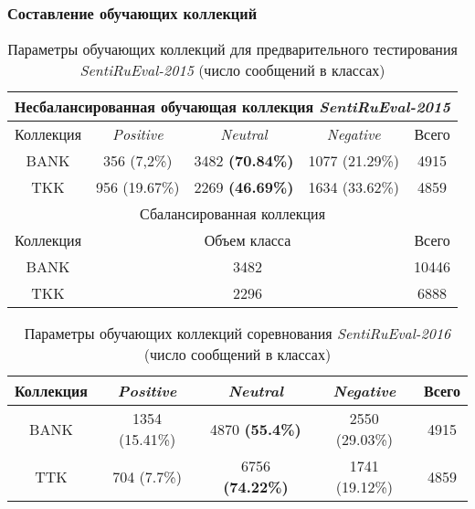 \subsubsection{Составление обучающих коллекций}

\begin{table}[!ht]
\centering
\caption{Параметры обучающих коллекций для предварительного тестирования {\it SentiRuEval-2015} (число сообщений в классах)}
\label{my-label}
\begin{tabular}{|c|c|c|c|c|}
\hline
\multicolumn{5}{|c|}{Несбалансированная обучающая коллекция {\it SentiRuEval-2015}}                 \\ \hline
Коллекция & \textit{Positive} & \textit{Neutral} & \textit{Negative} & Всего \\ \hline
BANK      & 356 (7,2\%)       & 3482 {\bf (70.84\%)}   & 1077 (21.29\%)    & 4915  \\ \hline
TKK       & 956 (19.67\%)     & 2269 {\bf (46.69\%)}   & 1634 (33.62\%)    & 4859  \\ \hline
\multicolumn{5}{|c|}{Сбалансированная коллекция}                             \\ \hline
Коллекция & \multicolumn{3}{c|}{Объем класса}                        & Всего \\ \hline
BANK      & \multicolumn{3}{c|}{3482}                                & 10446 \\ \hline
TKK       & \multicolumn{3}{c|}{2296}                                & 6888  \\ \hline
\end{tabular}
\end{table}

\begin{table}[!ht]
\centering
\caption{Параметры обучающих коллекций соревнования {\it SentiRuEval-2016} (число сообщений в классах)}
\label{my-label}
\begin{tabular}{|c|c|c|c|c|}
\hline
Коллекция & \textit{Positive} & \textit{Neutral} & \textit{Negative} & Всего \\ \hline
BANK      & 1354 (15.41\%)    & 4870 {\bf (55.4\%)}    & 2550 (29.03\%)    & 4915  \\ \hline
TTK       & 704 (7.7\%)       & 6756 {\bf (74.22\%)}   & 1741 (19.12\%)    & 4859  \\ \hline
\end{tabular}
\end{table}
